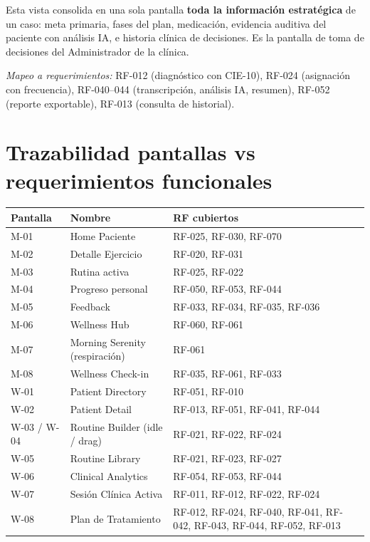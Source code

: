 Esta vista consolida en una sola pantalla \textbf{toda la información estratégica} de un caso: meta primaria, fases del plan, medicación, evidencia auditiva del paciente con análisis IA, e historia clínica de decisiones. Es la pantalla de toma de decisiones del Administrador de la clínica.

\textit{Mapeo a requerimientos:} RF-012 (diagnóstico con CIE-10), RF-024 (asignación con frecuencia), RF-040--044 (transcripción, análisis IA, resumen), RF-052 (reporte exportable), RF-013 (consulta de historial).


\section{Trazabilidad pantallas vs requerimientos funcionales}

\begin{longtable}{L{1.6cm} L{5cm} L{7.5cm}}
  \toprule
  \textbf{\color{fmAccent}Pantalla} &
  \textbf{\color{fmAccent}Nombre} &
  \textbf{\color{fmAccent}RF cubiertos} \\
  \midrule
  \endhead

  M-01 & Home Paciente & RF-025, RF-030, RF-070 \\
  M-02 & Detalle Ejercicio & RF-020, RF-031 \\
  M-03 & Rutina activa & RF-025, RF-022 \\
  M-04 & Progreso personal & RF-050, RF-053, RF-044 \\
  M-05 & Feedback & RF-033, RF-034, RF-035, RF-036 \\
  M-06 & Wellness Hub & RF-060, RF-061 \\
  M-07 & Morning Serenity (respiración) & RF-061 \\
  M-08 & Wellness Check-in & RF-035, RF-061, RF-033 \\
  W-01 & Patient Directory & RF-051, RF-010 \\
  W-02 & Patient Detail & RF-013, RF-051, RF-041, RF-044 \\
  W-03 / W-04 & Routine Builder (idle / drag) & RF-021, RF-022, RF-024 \\
  W-05 & Routine Library & RF-021, RF-023, RF-027 \\
  W-06 & Clinical Analytics & RF-054, RF-053, RF-044 \\
  W-07 & Sesión Clínica Activa & RF-011, RF-012, RF-022, RF-024 \\
  W-08 & Plan de Tratamiento & RF-012, RF-024, RF-040, RF-041, RF-042, RF-043, RF-044, RF-052, RF-013 \\
  \bottomrule
\end{longtable}

